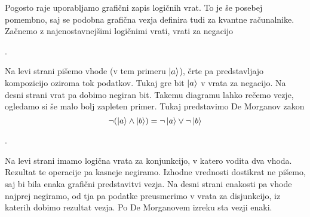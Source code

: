\documentclass[mat1]{fmfdelo}
\begin{document}
Pogosto raje uporabljamo grafični zapis logičnih vrat. To je še posebej pomembno, saj se podobna grafična vezja definira tudi za kvantne računalnike. Začnemo z najenostavnejšimi logičnimi vrati, vrati za negacijo
\begin{center}
    .
\end{center}
Na levi strani pišemo vhode (v tem primeru \(\ket{a}\)), črte pa predstavljajo kompozicijo oziroma tok podatkov. Tukaj gre bit \(\ket{a}\) v vrata za negacijo. Na desni strani vrat pa dobimo negiran bit. Takemu diagramu lahko rečemo vezje, ogledamo si še malo bolj zapleten primer. Tukaj predstavimo De Morganov zakon
\[
    \lnot(\ket{a}\land \ket{b}) = \lnot\ket{a} \lor \lnot \ket{b}
\]
\begin{center}
    .
\end{center}
Na levi strani imamo logična vrata za konjunkcijo, v katero vodita dva vhoda. Rezultat te operacije pa kasneje negiramo. Izhodne vrednosti dostikrat ne pišemo, saj bi bila enaka grafični predstavitvi vezja. Na desni strani enakosti pa vhode najprej negiramo, od tja pa podatke preusmerimo v vrata za disjunkcijo, iz katerih dobimo rezultat vezja. Po De Morganovem izreku sta vezji enaki.
\end{document}
